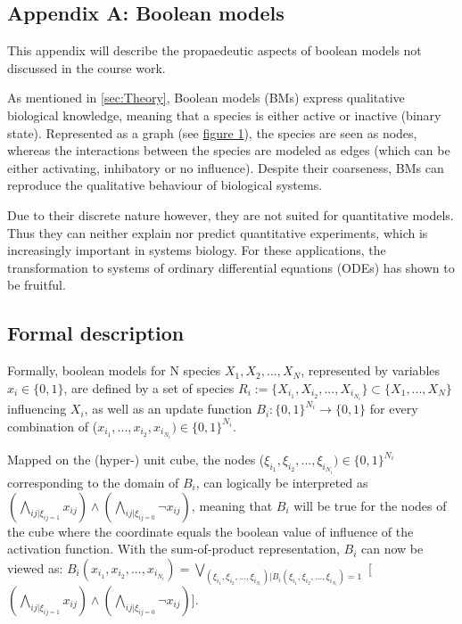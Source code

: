 \documentclass[11pt]{article}
\begin{document}
\begin{appendices}
\section*{Appendix A: Boolean models} \label{AppendixA}
This appendix will describe the propaedeutic aspects of boolean models not discussed in the course work.

As mentioned in \ref{sec:Theory}, Boolean models (BMs) express qualitative biological knowledge, meaning that a species is either active or inactive (binary state). Represented as a graph (see \hyperref[GRNs]{figure 1}), the species are seen as nodes, whereas the interactions between the species are modeled as edges (which can be either activating, inhibatory or no influence).
Despite their coarseness, BMs can reproduce the qualitative behaviour of biological systems.

Due to their discrete nature however, they are not suited for quantitative models. Thus they can neither explain nor predict quantitative experiments, which is increasingly important in systems biology. For these applications,
the transformation to systems of ordinary differential equations (ODEs) has shown to be fruitful.

\subsection*{Formal description} \label{ssec:Formaldescription}
Formally, boolean models for N species $X_{1}, X_{2},..., X_{N}$, represented by variables $x_{i} \in \{0, 1\}$, are
defined by a set of species $R_{i} := \{X_{i_{1}}, X_{i_{2}},..., X_{i_{N_{i}}}\} \subset
\{X_{1},...,X_{N}\}$ influencing $X_{i}$, as well as an update function $B_{i}: \{0, 1\}^{N_{i}} \rightarrow \{0, 1\}$ for every combination of ($x_{i_{1}},..., x_{i_{2}}, x_{i_{N_{i}}}) \in \{0, 1\}^{N_{i}}$.

Mapped on the (hyper-) unit cube, the nodes ($\xi_{i_{1}},\xi_{i_{2}},..., \xi_{i_{N_{i}}}) \in \{0, 1\}^{N_{i}}$ corresponding to the domain of $B_{i}$, can logically be interpreted as $( \bigwedge_{ij| \xi_{ij = 1}} x_{ij} ) \wedge ( \bigwedge_{ij| \xi_{ij = 0}} \neg x_{ij} )$, meaning that $B_{i}$ will be true for the nodes of the cube where
the coordinate equals the boolean value of influence of the activation function.
With the sum-of-product representation, $B_{i}$ can now be viewed as: $B_{i} (x_{i_{1}}, x_{i_{2}},..., x_{i_{N_{i}}} ) = \bigvee_{(\xi_{i_{1}}, \xi_{i_{2}},..., \xi_{i_{N_{i}}}) | B_{i} ( \xi_{i_{1}}, \xi_{i_{2}},..., \xi_{i_{N_{i}}}) = 1} $ [ $( \bigwedge_{ij | \xi_{ij = 1}} x_{ij}) \wedge ( \bigwedge _{ij | \xi_{ij = 0}}  \neg x_{ij} ) $].


\end{appendices}
\end{document}
